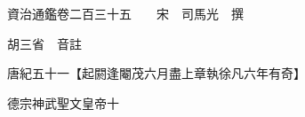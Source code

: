 










 


 
 


 

  
  
  
  
  





  
  
  
  
  
 
  

  

  
  
  



  

 
 

  
   




  

  
  


  　　資治通鑑卷二百三十五　　宋　司馬光　撰

　　胡三省　音註

　　唐紀五十一【起閼逢閹茂六月盡上章執徐凡六年有奇】

　　德宗神武聖文皇帝十


